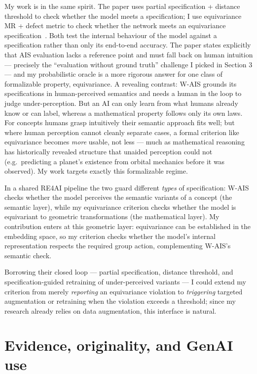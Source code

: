 \documentclass[11pt, a4paper]{article}
\begin{document}
My work is in the same spirit. The paper uses partial specification + distance threshold to check whether the model meets a specification; I use equivariance MR + defect metric to check whether the network meets an equivariance specification~\cite{dong2026equivarianceaugmentationbayesianneural}. Both test the internal behaviour of the model against a specification rather than only its end-to-end accuracy. The paper states explicitly that AIS evaluation lacks a reference point and must fall back on human intuition — precisely the ``evaluation without ground truth''\textbf{} challenge I picked in Section 3 — and my probabilistic oracle is a more rigorous answer for one class of formalizable property, equivariance. A revealing contrast: W-AIS grounds its specifications in human-perceived semantics and needs a human in the loop to judge under-perception. But an AI can only learn from what humans already know or can label, whereas a mathematical property follows only its own laws. For concepts humans grasp intuitively their semantic approach fits well; but where human perception cannot cleanly separate cases, a formal criterion like equivariance becomes \emph{more} usable, not less — much as mathematical reasoning has historically revealed structure that unaided perception could not (e.g.\ predicting a planet's existence from orbital mechanics before it was observed). My work targets exactly this formalizable regime.

In a shared RE4AI pipeline the two guard different \emph{types} of specification: W-AIS checks whether the model perceives the semantic variants of a concept (the semantic layer), while my equivariance criterion checks whether the model is equivariant to geometric transformations (the mathematical layer). My contribution enters at this geometric layer: equivariance can be established in the embedding space, so my criterion checks whether the model's internal representation respects the required group action, complementing W-AIS's semantic check.

Borrowing their closed loop — partial specification, distance threshold, and specification-guided retraining of under-perceived variants — I could extend my criterion from merely \emph{reporting} an equivariance violation to \emph{triggering} targeted augmentation or retraining when the violation exceeds a threshold; since my research already relies on data augmentation, this interface is natural.

\section{Evidence, originality, and GenAI use}
\end{document}

